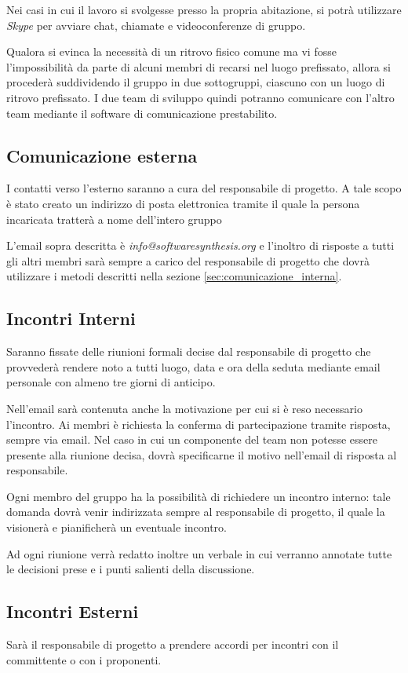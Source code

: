 Nei casi in cui il lavoro si svolgesse presso la propria abitazione, si potrà utilizzare \textit{Skype} per avviare chat, chiamate e videoconferenze di gruppo.

Qualora si evinca la necessità di un ritrovo fisico comune ma vi fosse l'impossibilità da parte di alcuni membri di recarsi nel luogo prefissato, allora si procederà suddividendo il gruppo in due sottogruppi, ciascuno con un luogo di ritrovo prefissato. I due team di sviluppo quindi potranno comunicare con l'altro team mediante il software di comunicazione prestabilito.


\subsection{Comunicazione esterna}
I contatti verso l'esterno saranno a cura del responsabile di progetto. A tale scopo è stato creato un indirizzo di posta elettronica tramite il quale la persona incaricata tratterà a nome dell'intero gruppo \team{}

L'email sopra descritta è \textit{info@softwaresynthesis.org} e l'inoltro di risposte a tutti gli altri membri sarà sempre a carico del responsabile di progetto che dovrà utilizzare i metodi descritti nella sezione \ref{sec:comunicazione_interna}.

\subsection{Incontri Interni}
Saranno fissate delle riunioni formali decise dal responsabile di progetto che provvederà rendere noto a tutti luogo, data e ora della seduta mediante email personale con almeno tre giorni di anticipo.

Nell'email sarà contenuta anche la motivazione per cui si è reso necessario l'incontro. Ai membri è richiesta la conferma di partecipazione tramite risposta, sempre via email. Nel caso in cui un componente del team non potesse essere presente alla riunione decisa, dovrà specificarne il motivo nell'email di risposta al responsabile.

Ogni membro del gruppo ha la possibilità di richiedere un incontro interno: tale domanda dovrà venir indirizzata sempre al responsabile di progetto, il quale la visionerà e pianificherà un eventuale incontro.

Ad ogni riunione verrà redatto inoltre un verbale in cui verranno annotate tutte le decisioni prese e i punti salienti della discussione.

\subsection{Incontri Esterni}
Sarà il responsabile di progetto a prendere accordi per incontri con il committente o con i proponenti.

